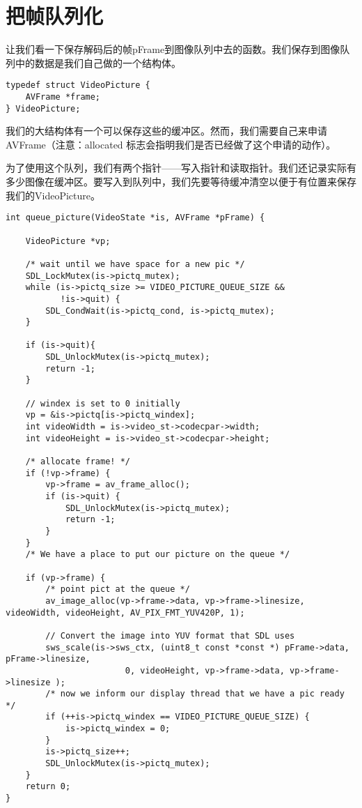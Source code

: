 \section{把帧队列化}

让我们看一下保存解码后的帧pFrame到图像队列中去的函数。我们保存到图像队列中的数据是我们自己做的一个结构体。

\begin{lstlisting}
typedef struct VideoPicture {
    AVFrame *frame;
} VideoPicture;
\end{lstlisting}

我们的大结构体有一个可以保存这些的缓冲区。然而，我们需要自己来申请AVFrame（注意：allocated 标志会指明我们是否已经做了这个申请的动作）。

为了使用这个队列，我们有两个指针——写入指针和读取指针。我们还记录实际有多少图像在缓冲区。要写入到队列中，我们先要等待缓冲清空以便于有位置来保存我们的VideoPicture。

\begin{lstlisting}
int queue_picture(VideoState *is, AVFrame *pFrame) {

    VideoPicture *vp;

    /* wait until we have space for a new pic */
    SDL_LockMutex(is->pictq_mutex);
    while (is->pictq_size >= VIDEO_PICTURE_QUEUE_SIZE &&
           !is->quit) {
        SDL_CondWait(is->pictq_cond, is->pictq_mutex);
    }

    if (is->quit){
        SDL_UnlockMutex(is->pictq_mutex);
        return -1;
    }

    // windex is set to 0 initially
    vp = &is->pictq[is->pictq_windex];
    int videoWidth = is->video_st->codecpar->width;
    int videoHeight = is->video_st->codecpar->height;

    /* allocate frame! */
    if (!vp->frame) {
        vp->frame = av_frame_alloc();
        if (is->quit) {
            SDL_UnlockMutex(is->pictq_mutex);
            return -1;
        }
    }
    /* We have a place to put our picture on the queue */

    if (vp->frame) {
        /* point pict at the queue */
        av_image_alloc(vp->frame->data, vp->frame->linesize, videoWidth, videoHeight, AV_PIX_FMT_YUV420P, 1);

        // Convert the image into YUV format that SDL uses
        sws_scale(is->sws_ctx, (uint8_t const *const *) pFrame->data, pFrame->linesize,
                        0, videoHeight, vp->frame->data, vp->frame->linesize );
        /* now we inform our display thread that we have a pic ready */
        if (++is->pictq_windex == VIDEO_PICTURE_QUEUE_SIZE) {
            is->pictq_windex = 0;
        }
        is->pictq_size++;
        SDL_UnlockMutex(is->pictq_mutex);
    }
    return 0;
}
\end{lstlisting}

